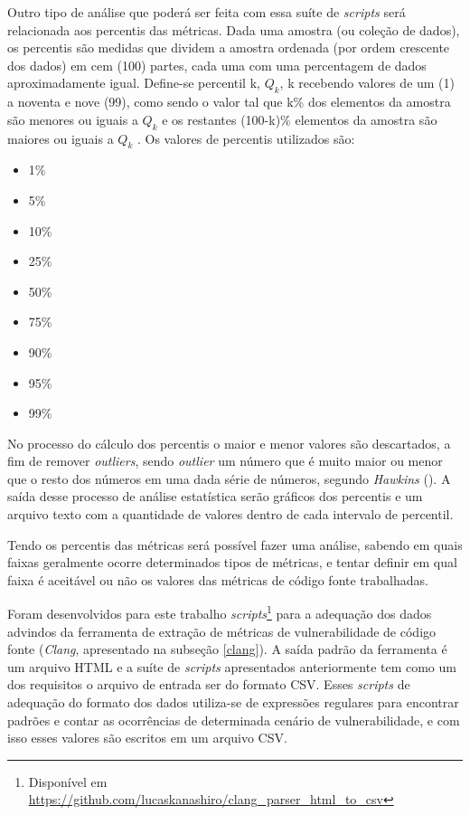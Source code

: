 Outro tipo de análise que poderá ser feita com essa suíte de \textit{scripts} será relacionada aos percentis das métricas.
Dada uma amostra (ou coleção de dados), os percentis são medidas que dividem a amostra ordenada (por ordem crescente dos dados) 
em cem (100) partes, cada uma com uma percentagem de dados aproximadamente igual. Define-se percentil k, ${Q_k}$, 
k recebendo valores de um (1) a noventa e nove (99), como sendo o valor tal que k\% dos elementos da amostra são menores ou 
iguais a ${Q_k}$ e os restantes (100-k)\% elementos da amostra são maiores ou iguais a ${Q_k}$ \cite{martins2013}. Os valores
de percentis utilizados são: 

\begin{multicols}{3}
  \begin{itemize}
    \item 1\%
    \item 5\%
    \item 10\%
    \item 25\%
    \item 50\%
    \item 75\%
    \item 90\%
    \item 95\%
    \item 99\%
  \end{itemize}
\end{multicols}

No processo do cálculo dos percentis o maior e menor valores são descartados, a
fim de remover \textit{outliers}, sendo \textit{outlier} um número que é muito maior 
ou menor que o resto dos números em uma dada série de números, segundo \emph{Hawkins}
(\citeyear{hawkins80}). A saída desse processo de análise estatística serão gráficos 
dos percentis e um arquivo texto com a quantidade de valores dentro de cada intervalo 
de percentil.

Tendo os percentis das métricas será possível fazer uma análise, sabendo em quais faixas geralmente ocorre 
determinados tipos de métricas, e tentar definir em qual faixa é aceitável ou não os valores das métricas de 
código fonte trabalhadas.

Foram desenvolvidos para este trabalho \textit{scripts}\footnote{Disponível em
\url{https://github.com/lucaskanashiro/clang\_parser\_html\_to\_csv}} para a adequação dos
dados advindos da ferramenta de extração de métricas de vulnerabilidade de
código fonte (\emph{Clang}, apresentado na subseção \ref{clang}). A saída padrão
da ferramenta é um arquivo HTML e a suíte de \textit{scripts} apresentados
anteriormente tem como um dos requisitos o arquivo de entrada ser do formato
CSV. Esses \textit{scripts} de adequação do formato dos dados utiliza-se de
expressões regulares para encontrar padrões e contar as ocorrências de
determinada cenário de vulnerabilidade, e com isso esses valores são escritos em
um arquivo CSV.

